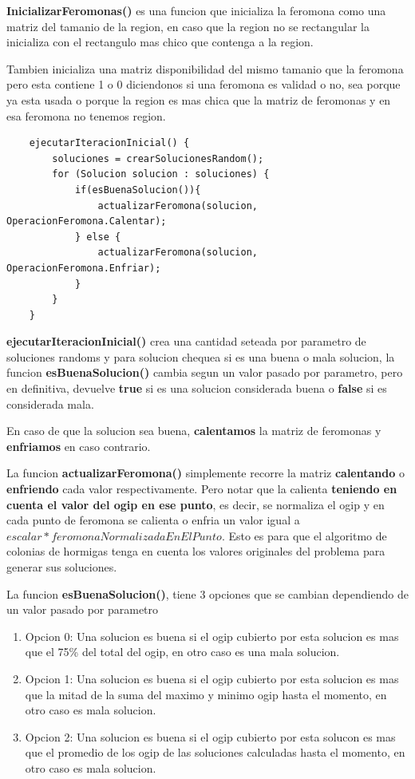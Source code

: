 \textbf{InicializarFeromonas()} es una funcion que inicializa la feromona como una matriz del tamanio de la region, en caso que la region no se rectangular la inicializa con el rectangulo mas chico que contenga a la region. 

Tambien inicializa una matriz disponibilidad del mismo tamanio que la feromona pero esta contiene 1 o 0 diciendonos si una feromona es validad o no, sea porque ya esta usada o porque la region es mas chica que la matriz de feromonas y en esa feromona no tenemos region.


\begin{verbatim}
    ejecutarIteracionInicial() {
        soluciones = crearSolucionesRandom();
        for (Solucion solucion : soluciones) {
            if(esBuenaSolucion()){
                actualizarFeromona(solucion, OperacionFeromona.Calentar);
            } else {
                actualizarFeromona(solucion, OperacionFeromona.Enfriar);
            }
        }
    }
\end{verbatim}		

\textbf{ejecutarIteracionInicial()} crea una cantidad seteada por parametro de soluciones randoms y para solucion chequea si es una buena o mala solucion, la funcion \textbf{esBuenaSolucion()} cambia segun un valor pasado por parametro, pero en definitiva, devuelve \textbf{true} si es una solucion considerada buena o \textbf{false} si es considerada mala. 

En caso de que la solucion sea buena, \textbf{calentamos} la matriz de feromonas y \textbf{enfriamos} en caso contrario.

La funcion \textbf{actualizarFeromona()} simplemente recorre la matriz \textbf{calentando} o \textbf{enfriendo} cada valor respectivamente. Pero notar que la calienta \textbf{teniendo en cuenta el valor del ogip en ese punto}, es decir, se normaliza el ogip y en cada punto de feromona se calienta o enfria un valor igual a $escalar * feromonaNormalizadaEnElPunto$. Esto es para que el algoritmo de colonias de hormigas tenga en cuenta los valores originales del problema para generar sus soluciones.


La funcion \textbf{esBuenaSolucion()}, tiene 3 opciones que se cambian dependiendo de un valor pasado por parametro

\begin{enumerate}
\item Opcion 0: Una solucion es buena si el ogip cubierto por esta solucion es mas que el 75\% del total del ogip, en otro caso es una mala solucion.
\item Opcion 1: Una solucion es buena si el ogip cubierto por esta solucion es mas que la mitad de la suma del maximo y minimo ogip hasta el momento, en otro caso es mala solucion.
\item Opcion 2: Una solucion es buena si el ogip cubierto por esta solucon es mas que el promedio de los ogip de las soluciones calculadas hasta el momento, en otro caso es mala solucion. 
\end{enumerate}



